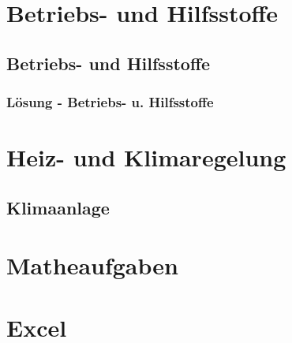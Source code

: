 \part{Betriebs- und Hilfsstoffe}

\chapter{Betriebs- und Hilfsstoffe}
 \newpage
\section{Lösung - Betriebs- u. Hilfsstoffe}
 \newpage

\part{Heiz- und Klimaregelung}

\chapter{Klimaanlage}
 




\part{Matheaufgaben}
 \newpage
 \newpage



\part{Excel}

